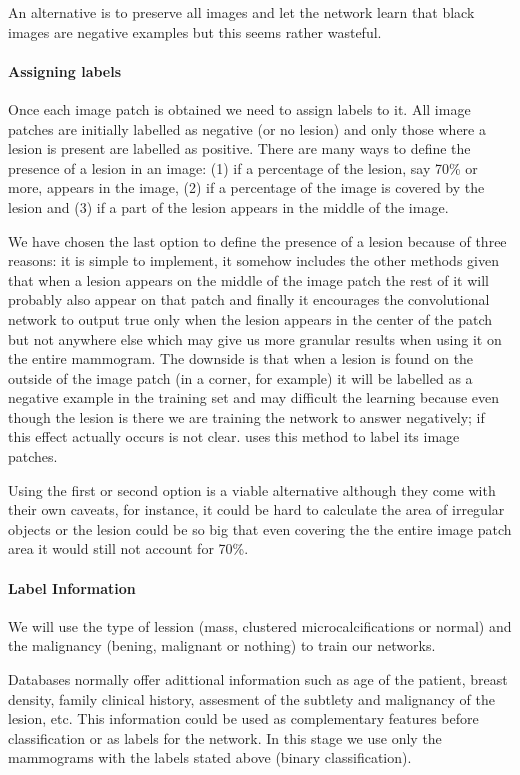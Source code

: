 An alternative is to preserve all images and let the network learn that black images are negative examples but this seems rather wasteful.

\paragraph{Assigning labels}
Once each image patch is obtained we need to assign labels to it. All image patches are initially labelled as negative (or no lesion) and only those where a lesion is present are labelled as positive. There are many ways to define the presence of a lesion in an image: (1) if a percentage of the lesion, say 70\% or more, appears in the image, (2) if a percentage of the image is covered by the lesion and (3) if a part of the lesion appears in the middle of the image.

We have chosen the last option to define the presence of a lesion because of three reasons: it is simple to implement, it somehow includes the other methods given that when a lesion appears on the middle of the image patch the rest of it will probably also appear on that patch and finally it encourages the convolutional network to output true only when the lesion appears in the center of the patch but not anywhere else which may give us more granular results when using it on the entire mammogram. The downside is that when a lesion is found on the outside of the image patch (in a corner, for example) it will be labelled as a negative example in the training set and may difficult the learning because even though the lesion is there we are training the network to answer negatively; if this effect actually occurs is not clear. \cite{Ciresan2013} uses this method to label its image patches.

Using the first or second option is a viable alternative although they come with their own caveats, for instance, it could be hard to calculate the area of irregular objects or the lesion could be so big that even covering the the entire image patch area it would still not account for 70\%.

\paragraph{Label Information}
We will use the type of lession (mass, clustered microcalcifications or normal) and the malignancy (bening, malignant or nothing) to train our networks. 

Databases normally offer adittional information such as age of the patient, breast density, family clinical history, assesment of the subtlety and malignancy of the lesion, etc. This information could be used as complementary features before classification or as labels for the network. In this stage we use only the mammograms with the labels stated above (binary classification).

